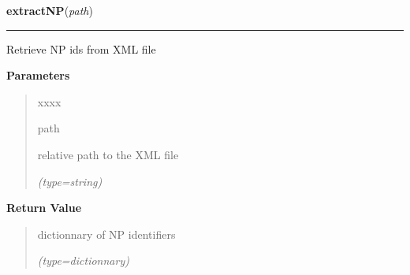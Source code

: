 \hspace{.8\funcindent}\begin{boxedminipage}{\funcwidth}

    \raggedright \textbf{extractNP}(\textit{path})

    \vspace{-1.5ex}

    \rule{\textwidth}{0.5\fboxrule}
\setlength{\parskip}{2ex}
    Retrieve NP ids from XML file

\setlength{\parskip}{1ex}
      \textbf{Parameters}
      \vspace{-1ex}

      \begin{quote}
        \begin{Ventry}{xxxx}

          \item[path]

          relative path to the XML file

            {\it (type=string)}

        \end{Ventry}

      \end{quote}

      \textbf{Return Value}
    \vspace{-1ex}

      \begin{quote}
      dictionnary of NP identifiers

      {\it (type=dictionnary)}

      \end{quote}

    \end{boxedminipage}

    \label{GoXML:idmapping}

    \vspace{0.5ex}

